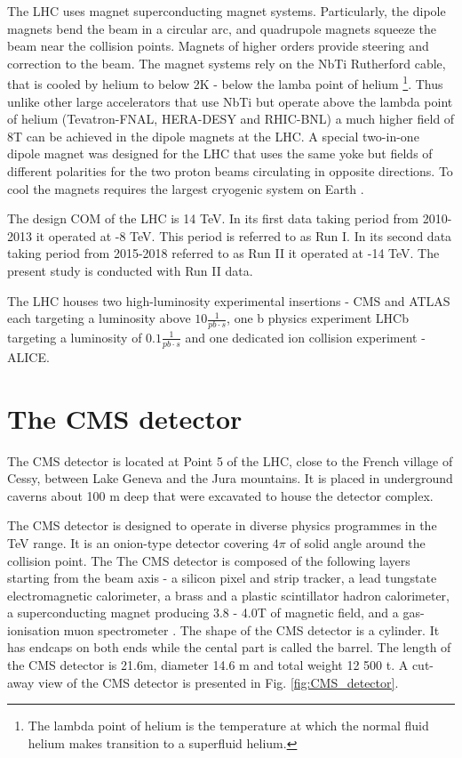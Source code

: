 The LHC uses magnet superconducting magnet systems. Particularly, the dipole magnets bend the beam in a circular arc, and quadrupole magnets squeeze the beam near the collision points. Magnets of higher orders provide steering and correction to the beam. The magnet systems rely on the NbTi Rutherford cable, that is cooled by helium to below 2K - below the lamba point of helium \footnote{The lambda point of helium is the temperature at which the normal fluid helium makes transition to a superfluid helium.}. Thus unlike other large accelerators that use NbTi but operate above the lambda point of helium (Tevatron-FNAL, HERA-DESY and RHIC-BNL) a much higher field of 8T can be achieved in the dipole magnets at the LHC. A special two-in-one dipole magnet was designed for the LHC that uses the same yoke but fields of different polarities for the two proton beams circulating in opposite directions. To cool the magnets requires the largest cryogenic system on Earth \cite{MYERS:2013hra} \cite{Evans:2008zzb}.

The design COM of the LHC is 14 TeV. In its first data taking period from 2010-2013 it operated at -8 TeV. This period is referred to as Run I. In its second data taking period from 2015-2018 referred to as Run II it operated at -14 TeV. The present study is conducted with Run II data.

The LHC houses two high-luminosity experimental insertions - CMS and ATLAS each targeting a luminosity above $10{\frac{1}{pb\cdot s}}$, one b physics experiment LHCb targeting a luminosity of $0.1\frac{1}{pb\cdot s}$ and one dedicated ion collision experiment - ALICE. 

\section{The CMS detector}

The CMS detector is located at Point 5 of the LHC, close to the French village of Cessy, between Lake Geneva and the Jura mountains. It is placed in underground caverns about 100 m deep that were excavated to house the detector complex.

The CMS detector is designed to operate in diverse physics programmes in the TeV range. It is an onion-type detector covering $4\pi$ of solid angle around the collision point. The The CMS detector is composed of the following layers starting from the beam axis - a silicon pixel and strip  tracker, a lead tungstate electromagnetic calorimeter, a brass and a plastic scintillator hadron calorimeter, a superconducting magnet producing 3.8 - 4.0T of magnetic field, and a gas-ionisation muon spectrometer \cite{Chatrchyan:2008aa}. The shape of the CMS detector is a cylinder. It has endcaps on both ends while the cental part is called the barrel. The length of the CMS detector is 21.6m, diameter 14.6 m and total weight 12 500 t. A cut-away view of the CMS detector is presented in Fig. \ref{fig:CMS_detector}.

